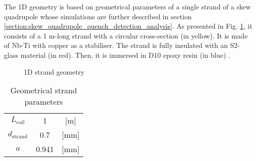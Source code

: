 
The 1D geometry is based on geometrical parameters of a single strand of a skew quadrupole whose simulations are further described in section \ref{section:skew_quadrupole_quench_detection_analysis}. As presented in Fig. \ref{fig: 1d_strand_geometry}, it consists of a 1 m-long strand with a circular cross-section (in yellow). It is made of Nb-Ti with copper as a stabiliser. The strand is fully insulated with an S2-glass material (in red). Then, it is immersed in D10 epoxy resin (in blue) \cite{hl_lhc_tech_design_report_v01}.

\begin{figure}[H]
    \centering
    \caption{1D strand geometry}
    \label{fig: 1d_strand_geometry}
\end{figure}

\begin{table}[h!]
    \caption{Geometrical strand parameters} 
    \vspace{-1.em} 
    \fontsize{10}{10}
    \selectfont 
    \renewcommand{\arraystretch}{1.5}
    \begin{center}
        \begin{tabular}{ ccc }  
        \hline
        $L_\text{coil}$ & 1 & [m] \\
        $d_\text{strand}$ & 0.7 & [mm] \\
        $a$ & 0.941 & [mm] \\
        \hline 
        \end{tabular}
    \end{center}  
     \label{table: 1d_quench_propagation_geometry_parameters} 
 \end{table}

